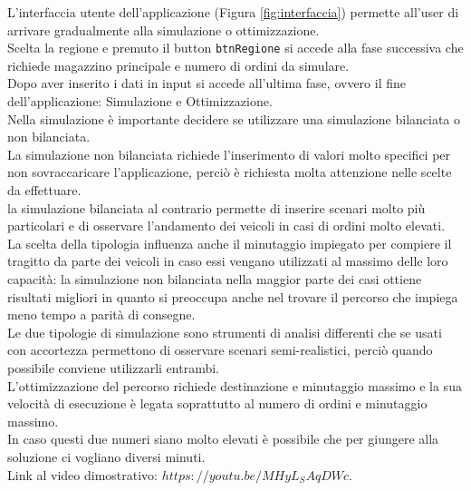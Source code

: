 \documentclass[a4paper,12pt]{report}
\begin{document}
L'interfaccia utente dell'applicazione (Figura \ref{fig:interfaccia}) permette all'user di arrivare gradualmente alla simulazione
o ottimizzazione.\\
Scelta la regione e premuto il button \texttt{btnRegione} si accede alla fase successiva che richiede
magazzino principale e numero di ordini da simulare.\\
Dopo aver inserito i dati in input si accede all'ultima fase, ovvero il fine dell'applicazione: Simulazione
e Ottimizzazione.\\
Nella simulazione è importante decidere se utilizzare una simulazione bilanciata o non bilanciata.\\
La simulazione non bilanciata richiede l'inserimento di valori molto specifici per non sovraccaricare 
l'applicazione, perciò è richiesta molta attenzione nelle scelte da effettuare.\\
la simulazione bilanciata al contrario permette di inserire scenari molto più particolari e di osservare 
l'andamento dei veicoli in casi di ordini molto elevati.\\
La scelta della tipologia influenza anche il minutaggio impiegato per compiere il tragitto
da parte dei veicoli in caso essi vengano utilizzati al massimo delle loro capacità: la 
simulazione non bilanciata nella maggior parte dei casi ottiene risultati migliori in quanto si
preoccupa anche nel trovare il percorso che impiega meno tempo a parità di consegne.\\
Le due tipologie di simulazione sono strumenti di analisi differenti che se usati con accortezza
permettono di osservare scenari semi-realistici, perciò quando possibile conviene utilizzarli entrambi.\\
L'ottimizzazione del percorso richiede destinazione e minutaggio massimo e la sua velocità di esecuzione
è legata soprattutto al numero di ordini e minutaggio massimo.\\
In caso questi due numeri siano molto elevati è possibile che per giungere alla soluzione ci vogliano
diversi minuti.\\
Link al video dimostrativo: \href{https://youtu.be/MHyL_SAqDWc}{$https://youtu.be/MHyL_SAqDWc$}.
\end{document}
